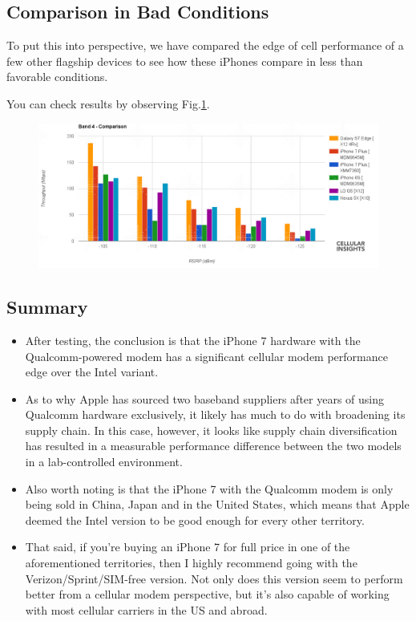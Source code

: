 \documentclass[conference]{IEEEtran}
\begin{document}
\subsection{Comparison in Bad Conditions}
To put this into perspective, we have compared the edge of cell performance of a few other flagship devices to see how these iPhones compare in less than favorable conditions.

You can check results by observing Fig.\ref{fig:band4comparison}.
\begin{figure}[!ht]
	\centering
	\begin{center}
		\includegraphics*[width=0.8\linewidth]{band4comparison}
		\caption{}
		\label{fig:band4comparison}
	\end{center}
\end{figure}

\subsection{Summary}
\begin{itemize}
	\item After testing, the conclusion is that the iPhone 7 hardware with the Qualcomm-powered modem has a significant cellular modem performance edge over the Intel variant.
	\item As to why Apple has sourced two baseband suppliers after years of using Qualcomm hardware exclusively, it likely has much to do with broadening its supply chain. In this case, however, it looks like supply chain diversification has resulted in a measurable performance difference between the two models in a lab-controlled environment.
	\item Also worth noting is that the iPhone 7 with the Qualcomm modem is only being sold in China, Japan and in the United States, which means that Apple deemed the Intel version to be good enough for every other territory.
	\item That said, if you’re buying an iPhone 7 for full price in one of the aforementioned territories, then I highly recommend going with the Verizon/Sprint/SIM-free version. Not only does this version seem to perform better from a cellular modem perspective, but it’s also capable of working with most cellular carriers in the US and abroad.	
\end{itemize}
\end{document}
